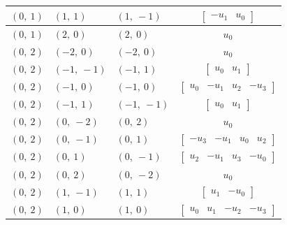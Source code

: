 \documentclass[11pt]{article}
\theoremstyle{definition}
\begin{document}
\begin{longtable}{|l|l|l|c|}
    \hline
    $\left( 0, \  1\right)$ & $\left( 1, \  1\right)$ & $\left( 1, \  -1\right)$ & $\left[\begin{matrix}- u_{1} & u_{0}\end{matrix}\right]$ \\
    \hline
    $\left( 0, \  1\right)$ & $\left( 2, \  0\right)$ & $\left( 2, \  0\right)$ & $u_{0}$ \\
    \hline
    $\left( 0, \  2\right)$ & $\left( -2, \  0\right)$ & $\left( -2, \  0\right)$ & $u_{0}$ \\
    \hline
    $\left( 0, \  2\right)$ & $\left( -1, \  -1\right)$ & $\left( -1, \  1\right)$ & $\left[\begin{matrix}u_{0} & u_{1}\end{matrix}\right]$ \\
    \hline
    $\left( 0, \  2\right)$ & $\left( -1, \  0\right)$ & $\left( -1, \  0\right)$ & $\left[\begin{matrix}u_{0} & - u_{1} & u_{2} & - u_{3}\end{matrix}\right]$ \\
    \hline
    $\left( 0, \  2\right)$ & $\left( -1, \  1\right)$ & $\left( -1, \  -1\right)$ & $\left[\begin{matrix}u_{0} & u_{1}\end{matrix}\right]$ \\
    \hline
    $\left( 0, \  2\right)$ & $\left( 0, \  -2\right)$ & $\left( 0, \  2\right)$ & $u_{0}$ \\
    \hline
    $\left( 0, \  2\right)$ & $\left( 0, \  -1\right)$ & $\left( 0, \  1\right)$ & $\left[\begin{matrix}- u_{3} & - u_{1} & u_{0} & u_{2}\end{matrix}\right]$ \\
    \hline
    $\left( 0, \  2\right)$ & $\left( 0, \  1\right)$ & $\left( 0, \  -1\right)$ & $\left[\begin{matrix}u_{2} & - u_{1} & u_{3} & - u_{0}\end{matrix}\right]$ \\
    \hline
    $\left( 0, \  2\right)$ & $\left( 0, \  2\right)$ & $\left( 0, \  -2\right)$ & $u_{0}$ \\
    \hline
    $\left( 0, \  2\right)$ & $\left( 1, \  -1\right)$ & $\left( 1, \  1\right)$ & $\left[\begin{matrix}u_{1} & - u_{0}\end{matrix}\right]$ \\
    \hline
    $\left( 0, \  2\right)$ & $\left( 1, \  0\right)$ & $\left( 1, \  0\right)$ & $\left[\begin{matrix}u_{0} & u_{1} & - u_{2} & - u_{3}\end{matrix}\right]$ \\

\end{longtable}
\end{document}
